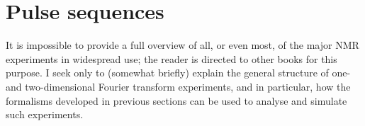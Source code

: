 \section{Pulse sequences}
\label{sec:theory__pulse_sequences}

It is impossible to provide a full overview of all, or even most, of the major NMR experiments in widespread use; the reader is directed to other books for this purpose.
I seek only to (somewhat briefly) explain the general structure of one- and two-dimensional Fourier transform experiments, and in particular, how the formalisms developed in previous sections can be used to analyse and simulate such experiments.






